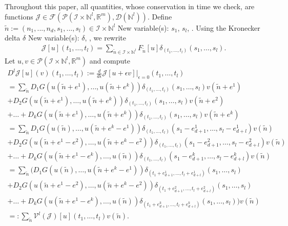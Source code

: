 \documentclass[sigconf,twocolumn]{acmart}
\newcommand{\1}{{\chi}}
\numberwithin{equation}{section}
\theoremstyle{thmlemcorr}
\numberwithin{theorem}{section}
\theoremstyle{thmlemcorr*}
\theoremstyle{defi}
\theoremstyle{remexample}
\theoremstyle{ass}
\begin{document}
Throughout this paper, all quantities, whose conservation in time we check, are functions \(\mathcal{J}\in\mathcal{F}(\mathcal{P}({\mathcal{I}}\times{\mathbb{N}}^l,{\mathbb{R}}^m),\mathcal{D}({\mathbb{N}}^l))\). 
Define \(\tilde{n}:=(n_1,...,n_d,s_1,...,s_l)\in{\mathcal{I}}\times{\mathbb{N}}^l\)
{\color{blue} New variable(s): \(s_1\), \(s_l\),  }
. Using the Kronecker delta \(\delta\)
{\color{blue} New variable(s): \(\delta\),  }
, we rewrite
\begin{gather*}
	\mathcal{J}[u](t_1,\ldots,t_{l})
	=\sum_{\tilde{n}\in{\mathcal{I}}\times{\mathbb{N}}^l}F_{\tilde{n}}[u]\delta_{(t_1,\ldots,t_{l})}(s_1,\ldots,s_l).
\end{gather*}
	Let \(u,v\in\mathcal{P}({\mathcal{I}}\times{\mathbb{N}}^l,{\mathbb{R}}^m)\) and compute
	\footnotesize
	\begin{gather*}
		D^l\mathcal{J}[u](v)(t_1,\ldots,t_{l}):=\frac{d}{d\epsilon}\mathcal{J}[u+\epsilon v]\Big|_{\epsilon=0}(t_1,\ldots,t_{l})\\
		=\sum_{\tilde{n}}D_1G(u(\tilde{n}+e^1),\ldots,u(\tilde{n}+e^k))\delta_{(t_1,\ldots,t_{l})}(s_1,\ldots,s_l)v(\tilde{n}+e^1)\\
		+D_2G(u(\tilde{n}+e^1),\ldots,u(\tilde{n}+e^k))\delta_{(t_1,\ldots,t_{l})}(s_1,\ldots,s_l)v(\tilde{n}+e^2)\\+\ldots
		+D_kG(u(\tilde{n}+e^1),\ldots,u(\tilde{n}+e^k))\delta_{(t_1,\ldots,t_{l})}(s_1,\ldots,s_l)v(\tilde{n}+e^k)\\
		=\sum_{\tilde{n}}D_1G(u(\tilde{n}),\ldots,u(\tilde{n}+e^k-e^1))\delta_{(t_1,\ldots,t_{l})}(s_1-e^1_{d+1},\ldots,s_l-e^1_{d+l})v(\tilde{n})\\
		+D_2G(u(\tilde{n}+e^1-e^2),\ldots,u(\tilde{n}+e^k-e^2))\delta_{(t_1,\ldots,t_{l})}(s_1-e^2_{d+1},\ldots,s_l-e^2_{d+l})v(\tilde{n})\\+\ldots
		+D_kG(u(\tilde{n}+e^1-e^k),\ldots,u(\tilde{n}))\delta_{(t_1,\ldots,t_{l})}(s_1-e^k_{d+1},\ldots,s_l-e^k_{d+l})v(\tilde{n})\\
		=\sum_{\tilde{n}}\Big(D_1G(u(\tilde{n}),\ldots,u(\tilde{n}+e^k-e^1))\delta_{(t_1+e^1_{d+1},\ldots,t_{l}+e^1_{d+l})}(s_1,\ldots,s_l)\\
		+D_2G(u(\tilde{n}+e^1-e^2),\ldots,u(\tilde{n}+e^k-e^2))\delta_{(t_1+e^2_{d+1},\ldots,t_{l}+e^2_{d+l})}(s_1,\ldots,s_l)\\+\ldots
		+D_kG(u(\tilde{n}+e^1-e^k),\ldots,u(\tilde{n}))\delta_{(t_1+e^k_{d+1},\ldots,t_{l}+e^k_{d+l})}(s_1,\ldots,s_l)\Big)v(\tilde{n})\\
		=:\sum_{\tilde{n}}\mathcal{V}^l(\mathcal{J})[u](t_1,\ldots,t_{l})v(\tilde{n}).
	\end{gather*}
\end{document}
